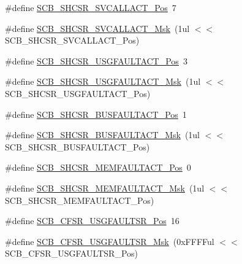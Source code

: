 \begin{DoxyCompactItemize}
\item 
\#define \hyperlink{group___c_m_s_i_s___c_m3___s_c_b_ga977f5176be2bc8b123873861b38bc02f}{S\-C\-B\-\_\-\-S\-H\-C\-S\-R\-\_\-\-S\-V\-C\-A\-L\-L\-A\-C\-T\-\_\-\-Pos}~7
\item 
\#define \hyperlink{group___c_m_s_i_s___c_m3___s_c_b_ga634c0f69a233475289023ae5cb158fdf}{S\-C\-B\-\_\-\-S\-H\-C\-S\-R\-\_\-\-S\-V\-C\-A\-L\-L\-A\-C\-T\-\_\-\-Msk}~(1ul $<$$<$ S\-C\-B\-\_\-\-S\-H\-C\-S\-R\-\_\-\-S\-V\-C\-A\-L\-L\-A\-C\-T\-\_\-\-Pos)
\item 
\#define \hyperlink{group___c_m_s_i_s___c_m3___s_c_b_gae06f54f5081f01ed3f6824e451ad3656}{S\-C\-B\-\_\-\-S\-H\-C\-S\-R\-\_\-\-U\-S\-G\-F\-A\-U\-L\-T\-A\-C\-T\-\_\-\-Pos}~3
\item 
\#define \hyperlink{group___c_m_s_i_s___c_m3___s_c_b_gab3166103b5a5f7931d0df90949c47dfe}{S\-C\-B\-\_\-\-S\-H\-C\-S\-R\-\_\-\-U\-S\-G\-F\-A\-U\-L\-T\-A\-C\-T\-\_\-\-Msk}~(1ul $<$$<$ S\-C\-B\-\_\-\-S\-H\-C\-S\-R\-\_\-\-U\-S\-G\-F\-A\-U\-L\-T\-A\-C\-T\-\_\-\-Pos)
\item 
\#define \hyperlink{group___c_m_s_i_s___c_m3___s_c_b_gaf272760f2df9ecdd8a5fbbd65c0b767a}{S\-C\-B\-\_\-\-S\-H\-C\-S\-R\-\_\-\-B\-U\-S\-F\-A\-U\-L\-T\-A\-C\-T\-\_\-\-Pos}~1
\item 
\#define \hyperlink{group___c_m_s_i_s___c_m3___s_c_b_ga9d7a8b1054b655ad08d85c3c535d4f73}{S\-C\-B\-\_\-\-S\-H\-C\-S\-R\-\_\-\-B\-U\-S\-F\-A\-U\-L\-T\-A\-C\-T\-\_\-\-Msk}~(1ul $<$$<$ S\-C\-B\-\_\-\-S\-H\-C\-S\-R\-\_\-\-B\-U\-S\-F\-A\-U\-L\-T\-A\-C\-T\-\_\-\-Pos)
\item 
\#define \hyperlink{group___c_m_s_i_s___c_m3___s_c_b_ga7c856f79a75dcc1d1517b19a67691803}{S\-C\-B\-\_\-\-S\-H\-C\-S\-R\-\_\-\-M\-E\-M\-F\-A\-U\-L\-T\-A\-C\-T\-\_\-\-Pos}~0
\item 
\#define \hyperlink{group___c_m_s_i_s___c_m3___s_c_b_ga9147fd4e1b12394ae26eadf900a023a3}{S\-C\-B\-\_\-\-S\-H\-C\-S\-R\-\_\-\-M\-E\-M\-F\-A\-U\-L\-T\-A\-C\-T\-\_\-\-Msk}~(1ul $<$$<$ S\-C\-B\-\_\-\-S\-H\-C\-S\-R\-\_\-\-M\-E\-M\-F\-A\-U\-L\-T\-A\-C\-T\-\_\-\-Pos)
\item 
\#define \hyperlink{group___c_m_s_i_s___c_m3___s_c_b_gac8e4197b295c8560e68e2d71285c7879}{S\-C\-B\-\_\-\-C\-F\-S\-R\-\_\-\-U\-S\-G\-F\-A\-U\-L\-T\-S\-R\-\_\-\-Pos}~16
\item 
\#define \hyperlink{group___c_m_s_i_s___c_m3___s_c_b_ga565807b1a3f31891f1f967d0fa30d03f}{S\-C\-B\-\_\-\-C\-F\-S\-R\-\_\-\-U\-S\-G\-F\-A\-U\-L\-T\-S\-R\-\_\-\-Msk}~(0x\-F\-F\-F\-Ful $<$$<$ S\-C\-B\-\_\-\-C\-F\-S\-R\-\_\-\-U\-S\-G\-F\-A\-U\-L\-T\-S\-R\-\_\-\-Pos)
$$
\end{DoxyCompactItemize}
